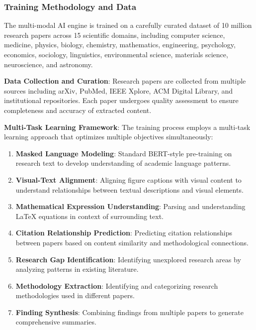 \documentclass[10pt,twocolumn]{article}
\begin{document}
\subsubsection{Training Methodology and Data}

The multi-modal AI engine is trained on a carefully curated dataset of 10 million research papers across 15 scientific domains, including computer science, medicine, physics, biology, chemistry, mathematics, engineering, psychology, economics, sociology, linguistics, environmental science, materials science, neuroscience, and astronomy.

\textbf{Data Collection and Curation}: Research papers are collected from multiple sources including arXiv, PubMed, IEEE Xplore, ACM Digital Library, and institutional repositories. Each paper undergoes quality assessment to ensure completeness and accuracy of extracted content.

\textbf{Multi-Task Learning Framework}: The training process employs a multi-task learning approach that optimizes multiple objectives simultaneously:

\begin{enumerate}
    \item \textbf{Masked Language Modeling}: Standard BERT-style pre-training on research text to develop understanding of academic language patterns.
    
    \item \textbf{Visual-Text Alignment}: Aligning figure captions with visual content to understand relationships between textual descriptions and visual elements.
    
    \item \textbf{Mathematical Expression Understanding}: Parsing and understanding LaTeX equations in context of surrounding text.
    
    \item \textbf{Citation Relationship Prediction}: Predicting citation relationships between papers based on content similarity and methodological connections.
    
    \item \textbf{Research Gap Identification}: Identifying unexplored research areas by analyzing patterns in existing literature.
    
    \item \textbf{Methodology Extraction}: Identifying and categorizing research methodologies used in different papers.
    
    \item \textbf{Finding Synthesis}: Combining findings from multiple papers to generate comprehensive summaries.
\end{enumerate}
\end{document}
